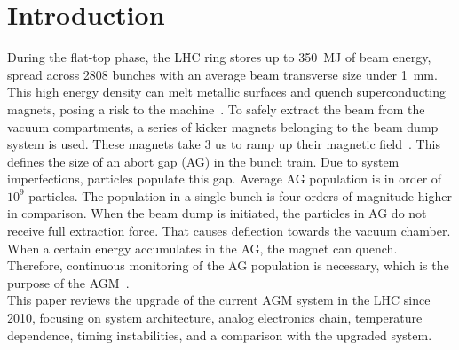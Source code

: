 \section{Introduction}
During the flat-top phase, the LHC ring stores up to \SI{350}{MJ} of beam energy,
spread across 2808 bunches with an average beam transverse size under
\SI{1}{mm}. This high energy density can melt metallic surfaces and quench
superconducting magnets, posing a risk to the machine~\cite{LHC_report}. 
To safely extract the beam from the vacuum compartments, a series of kicker
magnets belonging to the beam dump system is used. These magnets take 3 us to
ramp up their magnetic field~\cite{beam_dump_system}. This defines the size of
an abort gap (AG) in the bunch train. Due to system imperfections, particles
populate this gap. Average AG population is in order of $10^{9}$ particles. The
population in a single bunch is four orders of magnitude higher in comparison.
When the beam dump is initiated, the particles in AG do not receive full
extraction force. That causes deflection towards the vacuum chamber. When a
certain energy accumulates in the AG, the magnet can quench. Therefore,
continuous monitoring of the AG population is necessary, which is the purpose
of the AGM~\cite{particles_in_ag}.\\
This paper reviews the upgrade of the current AGM system in the LHC since 2010,
focusing on system architecture, analog electronics chain, temperature
dependence, timing instabilities, and a comparison with the upgraded system.

